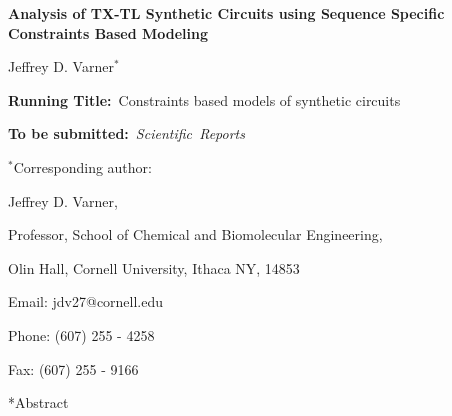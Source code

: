 \documentclass[12pt]{article}
\makeatletter
\renewcommand\section{\@startsection
	{subsection}{2}{0mm}
	{-0.2in}
	{0.05\baselineskip}
	{\normalfont\large\bfseries}}
\makeatother
\begin{document}
\begin{titlepage}
{\par\centering\textbf{\Large {Analysis of TX-TL Synthetic Circuits using Sequence Specific Constraints Based Modeling}}}
\vspace{0.05in}
{\par \centering \large{Jeffrey D. Varner$^{*}$}}
\vspace{0.10in}
{\par {}}
{\par {}}
\vspace{0.1in}
{\par \centering \textbf{Running Title:}~Constraints based models of synthetic circuits}
\vspace{0.1in}
{\par \centering \textbf{To be submitted:}~\emph{Scientific~Reports}}
\vspace{0.5in}
{\par \centering $^{*}$Corresponding author:}
{\par \centering Jeffrey D. Varner,}
{\par \centering Professor, School of Chemical and Biomolecular Engineering,}
{\par {} Olin Hall, Cornell University, Ithaca NY, 14853}
{\par \centering Email: jdv27@cornell.edu}
{\par \centering Phone: (607) 255 - 4258}
{\par \centering Fax: (607) 255 - 9166}
\end{titlepage}
\date{}
\thispagestyle{empty}
\pagebreak
\section*{Abstract}
\end{document}
